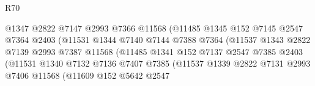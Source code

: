 \begin{lexlean}{R70}
\begin{coremodule}
                                        @1347
                                        @2822
                                        @7147
                                        @2993
                                        @7366
                                        @11568
                                        (@11485
                                          @1345
                                          @152
                                          @7145
                                          @2547
                                          @7364
                                          @2403
                                          (@11531
                                            @1344
                                            @7140
                                            @7144
                                            @7388
                                            @7364
                                            (@11537
                                              @1343
                                              @2822
                                              @7139
                                              @2993
                                              @7387
                                              @11568
                                              (@11485
                                                @1341
                                                @152
                                                @7137
                                                @2547
                                                @7385
                                                @2403
                                                (@11531
                                                  @1340
                                                  @7132
                                                  @7136
                                                  @7407
                                                  @7385
                                                  (@11537
                                                    @1339
                                                    @2822
                                                    @7131
                                                    @2993
                                                    @7406
                                                    @11568
                                                    (@11609
                                                      @152
                                                      @5642
                                                      @2547

\end{coremodule}
\end{lexlean}
